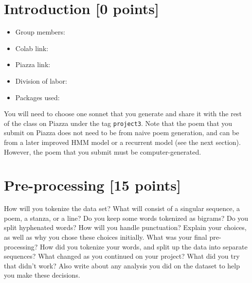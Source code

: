 \newif\ifshowsolutions
\showsolutionstrue







\pagestyle{fancy}




\newpage

\section{Introduction [0 points]}
\begin{itemize}
    \item Group members:
    \item Colab link:
    \item Piazza link:
    \item Division of labor:
    \item Packages used:
\end{itemize}

You will need to choose one sonnet that you generate and share it with the rest of the class on Piazza under the tag {\tt project3}. Note that the poem that you submit on Piazza does not need to be from naive poem generation, and can be from a later improved HMM model or a recurrent model (see the next section). However, the poem that you submit must be computer-generated.

\newpage

\section{Pre-processing [15 points]}

How will you tokenize the data set? What will consist of a singular sequence, a poem, a stanza, or a line? Do you keep some words tokenized as bigrams? Do you split hyphenated words? How will you handle punctuation? Explain your choices, as well as why you chose these choices initially. What was your final pre-processing? How did you tokenize your words, and split up the data into separate sequences? What changed as you continued on your project? What did you try that didn't work? Also write about any analysis you did on the dataset to help you make these decisions.

